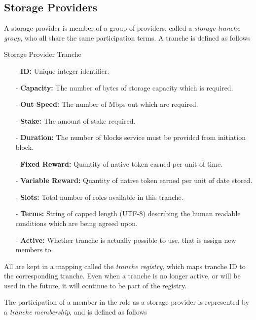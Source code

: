 \documentclass{article}
\newenvironment{concept_box}[1]
    {
    \begin{tcolorbox}
    {\large \textbf{#1} }
    }
    {
    \end{tcolorbox}
    }
\begin{document}
\subsection{Storage Providers}

A storage provider is member of a group of providers, called a \textit{storage tranche group}, who all share the same participation terms. A tranche is defined as follows \\

\begin{concept_box}{Storage Provider Tranche}
    \begin{itemize}
      \item[-] \textbf{ID:} Unique integer identifier.
      \item[-] \textbf{Capacity:} The number of bytes of storage capacity which is required.
      \item[-] \textbf{Out Speed:} The number of Mbps out which are required.
      \item[-] \textbf{Stake:} The amount of stake required.
      \item[-] \textbf{Duration:} The number of blocks service must be provided from initiation block.
      \item[-] \textbf{Fixed Reward:} Quantity of native token earned per unit of time.
      \item[-] \textbf{Variable Reward:} Quantity of native token earned per unit of date stored.
      \item[-] \textbf{Slots:} Total number of roles available in this tranche.
      \item[-] \textbf{Terms:} String of capped length (UTF-8) describing the human readable conditions which are being agreed upon.
      \item[-] \textbf{Active:} Whether tranche is actually possible to use, that is assign new members to.
    \end{itemize}
\end{concept_box}

All are kept in a mapping called the \textit{tranche registry}, which maps tranche ID to the corresponding tranche. Even when a tranche is no longer active, or will be used in the future, it will continue to be part of the registry.

The participation of a member in the role as a storage provider is represented by a \textit{tranche membership}, and is defined as follows \\
\end{document}
